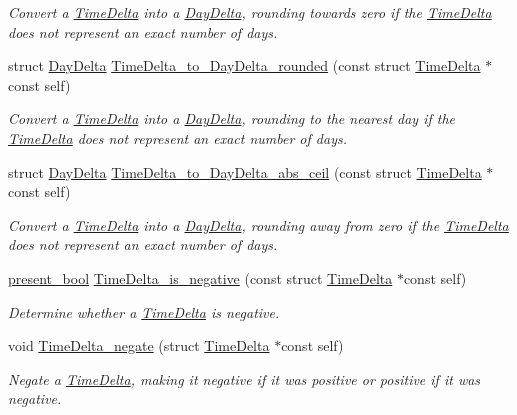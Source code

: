 \begin{DoxyCompactItemize}
\begin{DoxyCompactList}\small\item\em Convert a \hyperlink{structTimeDelta}{Time\-Delta} into a \hyperlink{structDayDelta}{Day\-Delta}, rounding towards zero if the \hyperlink{structTimeDelta}{Time\-Delta} does not represent an exact number of days. \end{DoxyCompactList}\item 
struct \hyperlink{structDayDelta}{Day\-Delta} \hyperlink{time-delta_8h_a7bbf766c60002c0835d0a81dfdfa7918}{Time\-Delta\-\_\-to\-\_\-\-Day\-Delta\-\_\-rounded} (const struct \hyperlink{structTimeDelta}{Time\-Delta} $\ast$const self)
\begin{DoxyCompactList}\small\item\em Convert a \hyperlink{structTimeDelta}{Time\-Delta} into a \hyperlink{structDayDelta}{Day\-Delta}, rounding to the nearest day if the \hyperlink{structTimeDelta}{Time\-Delta} does not represent an exact number of days. \end{DoxyCompactList}\item 
struct \hyperlink{structDayDelta}{Day\-Delta} \hyperlink{time-delta_8h_ae1a3f58fc84a366415dc6cde308b27ee}{Time\-Delta\-\_\-to\-\_\-\-Day\-Delta\-\_\-abs\-\_\-ceil} (const struct \hyperlink{structTimeDelta}{Time\-Delta} $\ast$const self)
\begin{DoxyCompactList}\small\item\em Convert a \hyperlink{structTimeDelta}{Time\-Delta} into a \hyperlink{structDayDelta}{Day\-Delta}, rounding away from zero if the \hyperlink{structTimeDelta}{Time\-Delta} does not represent an exact number of days. \end{DoxyCompactList}\item 
\hyperlink{types_8h_a1c24e2cdd988b886e889080ded176ae0}{present\-\_\-bool} \hyperlink{time-delta_8h_a4fc42a10abf8771117d2f9ced4f11bf2}{Time\-Delta\-\_\-is\-\_\-negative} (const struct \hyperlink{structTimeDelta}{Time\-Delta} $\ast$const self)
\begin{DoxyCompactList}\small\item\em Determine whether a \hyperlink{structTimeDelta}{Time\-Delta} is negative. \end{DoxyCompactList}\item 
void \hyperlink{time-delta_8h_a906aa66074e2d9ef675ea2d2a1d25084}{Time\-Delta\-\_\-negate} (struct \hyperlink{structTimeDelta}{Time\-Delta} $\ast$const self)
\begin{DoxyCompactList}\small\item\em Negate a \hyperlink{structTimeDelta}{Time\-Delta}, making it negative if it was positive or positive if it was negative. \end{DoxyCompactList}\item 

\end{DoxyCompactItemize}

